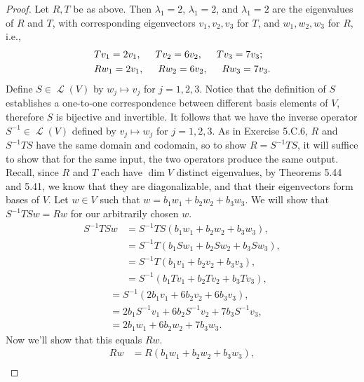 \documentclass[letterpaper, 12pt]{amsart}
\DeclareMathOperator{\Ell}{\mathscr{L}}				%
\theoremstyle{definition}  							%
\begin{document}
		\begin{proof}
		Let $R,T$ be as above.
		Then $\lambda_{1} = 2$, $\lambda_{1} = 2$, and $\lambda_{1} = 2$ are the eigenvalues of $R$ and $T$, with corresponding eigenvectors $v_{1}, v_{2}, v_{3}$ for $T$, and $w_{1}, w_{2}, w_{3}$ for $R$, i.e.,
			\begin{align*}
				&Tv_{1} = 2v_{1}, \hspace{5mm} Tv_{2} = 6v_{2}, \hspace{5mm} Tv_{3} = 7v_{3}; \\
				&Rw_{1} = 2v_{1}, \hspace{5mm} Rw_{2} = 6v_{2}, \hspace{5mm} Rw_{3} = 7v_{3}.
			\end{align*}
		Define $S \in \Ell(V)$ by $w_{j} \mapsto v_{j}$ for $j = 1,2,3$.
		Notice that the definition of $S$ establishes a one-to-one correspondence between different basis elements of $V$, therefore $S$ is bijective and invertible.
		It follows that we have the inverse operator $S^{-1} \in \Ell(V)$ defined by $v_{j} \mapsto w_{j}$ for $j = 1,2,3$.
		As in Exercise 5.C.6, $R$ and $S^{-1}TS$ have the same domain and codomain, so to show $R = S^{-1}TS$, it will suffice to show that for the same input, the two operators produce the same output.
		Recall, since $R$ and $T$ each have $\dim V$ distinct eigenvalues, by Theorems 5.44 and 5.41, we know that they are diagonalizable, and that their eigenvectors form bases of $V$.
		Let $w \in V$ such that $w = b_{1}w_{1} + b_{2}w_{2} + b_{3}w_{3}$.
		We will show that $S^{-1}TSw = Rw$ for our arbitrarily chosen $w$.
			\begin{align*}
				S^{-1}TSw &= S^{-1}TS(b_{1}w_{1} + b_{2}w_{2} + b_{3}w_{3}), \\
				&= S^{-1} T(b_{1}Sw_{1} + b_{2}Sw_{2} + b_{3}Sw_{3}), \\
				&= S^{-1} T(b_{1}v_{1} + b_{2}v_{2} + b_{3}v_{3}), \\
				&= S^{-1}(b_{1}Tv_{1} + b_{2}Tv_{2} + b_{3}Tv_{3}),
			\end{align*}
			\begin{align*}
				&= S^{-1}(2b_{1}v_{1} + 6b_{2}v_{2} + 6b_{3}v_{3}), \\
				&= 2b_{1}S^{-1}v_{1} + 6b_{2}S^{-1}v_{2} + 7b_{3}S^{-1}v_{3}, \\
				&= 2b_{1}w_{1} + 6b_{2}w_{2} + 7b_{3}w_{3}.
			\end{align*}
		Now we'll show that this equals $Rw$.
			\begin{align*}
				Rw &= R(b_{1}w_{1} + b_{2}w_{2} + b_{3}w_{3}), \\

\end{align*}
\end{proof}
\end{document}
